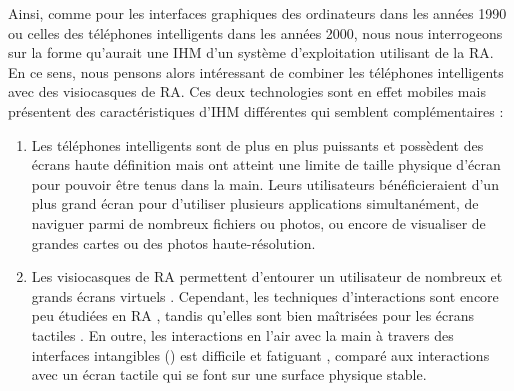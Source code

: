 Ainsi, comme pour les interfaces graphiques des ordinateurs dans les années 1990 ou celles des téléphones intelligents dans les années 2000, nous nous interrogeons sur la forme qu'aurait une IHM d'un système d'exploitation utilisant de la RA. En ce sens, nous pensons alors intéressant de combiner les téléphones intelligents avec des visiocasques de RA. Ces deux technologies sont en effet mobiles mais présentent des caractéristiques d'IHM différentes qui semblent complémentaires :
\begin{enumerate}
  \item Les téléphones intelligents sont de plus en plus puissants et possèdent des écrans haute définition mais ont atteint une limite de taille physique d'écran pour pouvoir être tenus dans la main. Leurs utilisateurs bénéficieraient d'un plus grand écran pour d'utiliser plusieurs applications simultanément, de naviguer parmi de nombreux fichiers ou photos, ou encore de visualiser de grandes cartes ou des photos haute-résolution.
  \item Les visiocasques de RA permettent d'entourer un utilisateur de nombreux et grands écrans virtuels \citep{Ens2014}. Cependant, 
  les techniques d'interactions sont encore peu étudiées en RA \citep{Piumsomboon2013}, tandis qu'elles sont bien maîtrisées pour les écrans tactiles \citep{Wobbrock2009}. En outre, les interactions en l'air avec la main à travers des interfaces intangibles () est difficile \citep{Chan2010} et fatiguant \citep{Hincapie-Ramos2014}, comparé aux interactions avec un écran tactile qui se font sur une surface physique stable.
\end{enumerate}
\medskip

